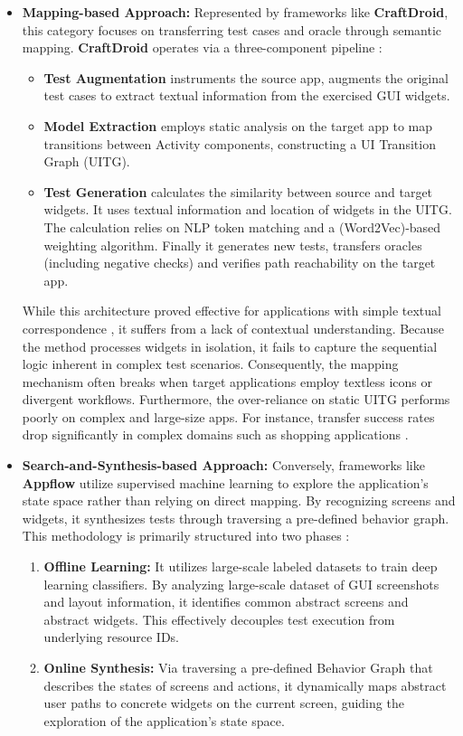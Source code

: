 \documentclass[acmsmall,nonacm]{acmart}
\begin{document}
\begin{itemize}
    \item \textbf{Mapping-based Approach:} Represented by frameworks like \textbf{CraftDroid}, this category focuses on transferring test cases and oracle through semantic mapping. \textbf{CraftDroid} operates via a three-component pipeline \cite{8952228}:
    \begin{itemize}
        \item\textbf{Test Augmentation} instruments the source app, augments the original test cases to extract textual information from the exercised GUI widgets.
        \item\textbf{Model Extraction} employs static analysis on the target app to map transitions between Activity components, constructing a UI Transition Graph (UITG).
        \item\textbf{Test Generation} calculates the similarity between source and target widgets. It uses textual information and location of widgets in the UITG. The calculation relies on NLP token matching and a (Word2Vec)-based weighting algorithm. Finally it generates new tests, transfers oracles (including negative checks) and verifies path reachability on the target app.
    \end{itemize}
    
    While this architecture proved effective for applications with simple textual correspondence , it suffers from a lack of contextual understanding. Because the method processes widgets in isolation, it fails to capture the sequential logic inherent in complex test scenarios. Consequently, the mapping mechanism often breaks when target applications employ textless icons or divergent workflows. Furthermore, the over-reliance on static UITG performs poorly on complex and large-size apps. For instance, transfer success rates drop significantly in complex domains such as shopping applications \cite{8952228}.

    
    \item \textbf{Search-and-Synthesis-based Approach:} Conversely, frameworks like \textbf{Appflow} utilize supervised machine learning to explore the application's state space rather than relying on direct mapping. By recognizing screens and widgets, it synthesizes tests through traversing a pre-defined behavior graph. This methodology is primarily structured into two phases \cite{10.1145/3236024.3236055}: \begin{enumerate}
        \item \textbf{Offline Learning: }It utilizes large-scale labeled datasets to train deep learning classifiers. By analyzing large-scale dataset of GUI screenshots and layout information, it identifies common abstract screens and abstract widgets. This effectively decouples test execution from underlying resource IDs.
        \item \textbf{Online Synthesis: }Via traversing a pre-defined Behavior Graph that describes the states of screens and actions, it dynamically maps abstract user paths to concrete widgets on the current screen, guiding the exploration of the application's state space.
    \end{enumerate}


\end{itemize}
\end{document}
